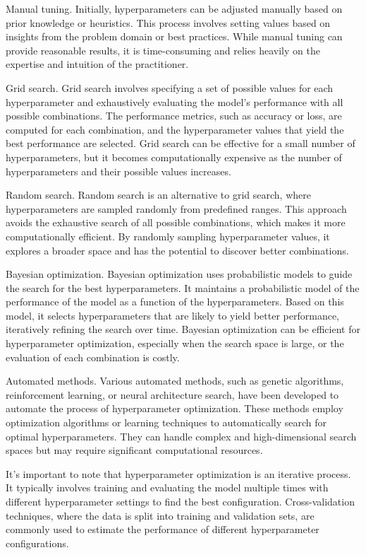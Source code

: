 \documentclass[9pt,bestpractices]{livecoms}
\begin{document}
Manual tuning. Initially, hyperparameters can be adjusted manually based on prior knowledge or heuristics. This process involves setting values based on insights from the problem domain or best practices. While manual tuning can provide reasonable results, it is time-consuming and relies heavily on the expertise and intuition of the practitioner.

Grid search. Grid search involves specifying a set of possible values for each hyperparameter and exhaustively evaluating the model's performance with all possible combinations. The performance metrics, such as accuracy or loss, are computed for each combination, and the hyperparameter values that yield the best performance are selected. Grid search can be effective for a small number of hyperparameters, but it becomes computationally expensive as the number of hyperparameters and their possible values increases.

Random search. Random search is an alternative to grid search, where hyperparameters are sampled randomly from predefined ranges. This approach avoids the exhaustive search of all possible combinations, which makes it more computationally efficient. By randomly sampling hyperparameter values, it explores a broader space and has the potential to discover better combinations.

Bayesian optimization. Bayesian optimization uses probabilistic models to guide the search for the best hyperparameters. It maintains a probabilistic model of the performance of the model as a function of the hyperparameters. Based on this model, it selects hyperparameters that are likely to yield better performance, iteratively refining the search over time. Bayesian optimization can be efficient for hyperparameter optimization, especially when the search space is large, or the evaluation of each combination is costly.

Automated methods. Various automated methods, such as genetic algorithms, reinforcement learning, or neural architecture search, have been developed to automate the process of hyperparameter optimization. These methods employ optimization algorithms or learning techniques to automatically search for optimal hyperparameters. They can handle complex and high-dimensional search spaces but may require significant computational resources.

It's important to note that hyperparameter optimization is an iterative process. It typically involves training and evaluating the model multiple times with different hyperparameter settings to find the best configuration. Cross-validation techniques, where the data is split into training and validation sets, are commonly used to estimate the performance of different hyperparameter configurations.
\end{document}
